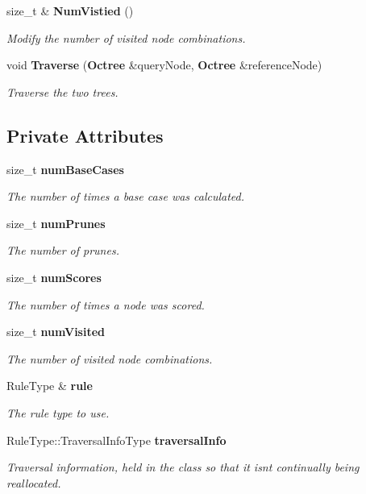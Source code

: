 \begin{DoxyCompactItemize}
size\+\_\+t \& {\bf Num\+Vistied} ()
\begin{DoxyCompactList}\small\item\em Modify the number of visited node combinations. \end{DoxyCompactList}\item 
void {\bf Traverse} ({\bf Octree} \&query\+Node, {\bf Octree} \&reference\+Node)
\begin{DoxyCompactList}\small\item\em Traverse the two trees. \end{DoxyCompactList}\end{DoxyCompactItemize}
\subsection*{Private Attributes}
\begin{DoxyCompactItemize}
\item 
size\+\_\+t {\bf num\+Base\+Cases}
\begin{DoxyCompactList}\small\item\em The number of times a base case was calculated. \end{DoxyCompactList}\item 
size\+\_\+t {\bf num\+Prunes}
\begin{DoxyCompactList}\small\item\em The number of prunes. \end{DoxyCompactList}\item 
size\+\_\+t {\bf num\+Scores}
\begin{DoxyCompactList}\small\item\em The number of times a node was scored. \end{DoxyCompactList}\item 
size\+\_\+t {\bf num\+Visited}
\begin{DoxyCompactList}\small\item\em The number of visited node combinations. \end{DoxyCompactList}\item 
Rule\+Type \& {\bf rule}
\begin{DoxyCompactList}\small\item\em The rule type to use. \end{DoxyCompactList}\item 
Rule\+Type\+::\+Traversal\+Info\+Type {\bf traversal\+Info}
\begin{DoxyCompactList}\small\item\em Traversal information, held in the class so that it isn\textquotesingle{}t continually being reallocated. \end{DoxyCompactList}\end{DoxyCompactItemize}



